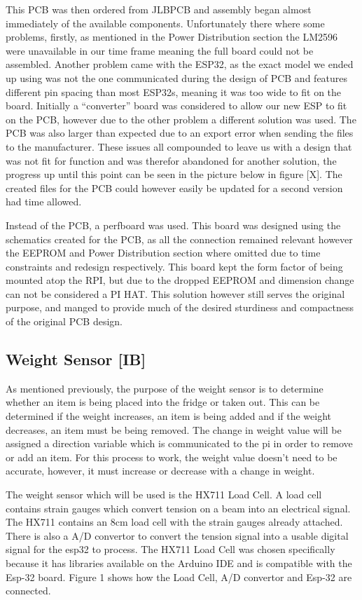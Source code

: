 This PCB was then ordered from JLBPCB and assembly began almost immediately of the available components.
Unfortunately there where some problems, firstly, as mentioned in the Power Distribution section the LM2596 were unavailable in our time frame meaning the full board could not be assembled.
Another problem came with the ESP32, as the exact model we ended up using was not the one communicated during the design of PCB and features different pin spacing than most ESP32s, meaning it was too wide to fit on the board.
Initially a “converter” board was considered to allow our new ESP to fit on the PCB, however due to the other problem a different solution was used.
The PCB was also larger than expected due to an export error when sending the files to the manufacturer.
These issues all compounded to leave us with a design that was not fit for function and was therefor abandoned for another solution, the progress up until this point can be seen in the picture below in figure [X].
The created files for the PCB could however easily be updated for a second version had time allowed.



Instead of the PCB, a perfboard was used.
This board was designed using the schematics created for the PCB, as all the connection remained relevant however the EEPROM and Power Distribution section where omitted due to time constraints and redesign respectively.
This board kept the form factor of being mounted atop the RPI, but due to the dropped EEPROM and dimension change can not be considered a PI HAT.
This solution however still serves the original purpose, and manged to provide much of the desired sturdiness and compactness of the original PCB design.


\subsection{Weight Sensor [IB]}

As mentioned previously, the purpose of the weight sensor is to determine whether an item is being placed into the fridge or taken out.
This can be determined if the weight increases, an item is being added and if the weight decreases, an item must be being removed.
The change in weight value will be assigned a direction variable which is communicated to the pi in order to remove or add an item.
For this process to work, the weight value doesn't need to be accurate, however, it must increase or decrease with a change in weight.

The weight sensor which will be used is the HX711 Load Cell.
A load cell contains strain gauges which convert tension on a beam into an electrical signal.
The HX711 contains an 8cm load cell with the strain gauges already attached.
There is also a A/D convertor to convert the tension signal into a usable digital signal for the esp32 to process.
The HX711 Load Cell was chosen specifically because it has libraries available on the Arduino IDE and is compatible with the Esp-32 board.
Figure 1 shows how the Load Cell, A/D convertor and Esp-32 are connected.

